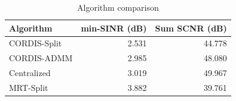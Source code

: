 \begin{table}[h]
\centering
\caption{Algorithm comparison}
\label{tab:example}
\begin{tabular}{lrr}
\toprule
Algorithm & min-SINR (dB) & Sum SCNR (dB) \\
\midrule
CORDIS-Split & 2.531 & 44.778 \\
CORDIS-ADMM & 2.985 & 48.080 \\
Centralized & 3.019 & 49.967 \\
MRT-Split & 3.882 & 39.761 \\
\bottomrule
\end{tabular}
\end{table}